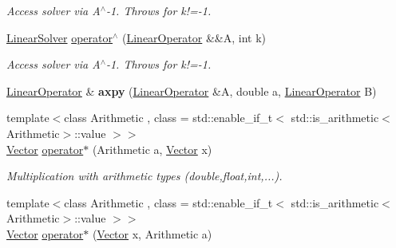 \begin{DoxyCompactItemize}
\begin{DoxyCompactList}\small\item\em Access solver via A$^\wedge$-\/1. Throws for k!=-\/1. \end{DoxyCompactList}\item 
\hyperlink{namespaceSpacy_adcd0d78166a9c972b8a2e5a689fc2d03}{Linear\+Solver} \hyperlink{namespaceSpacy_a6defec6ee302bf4c1054afc65c9fcb95}{operator$^\wedge$} (\hyperlink{classSpacy_1_1LinearOperator}{Linear\+Operator} \&\&A, int k)\hypertarget{namespaceSpacy_a6defec6ee302bf4c1054afc65c9fcb95}{}\label{namespaceSpacy_a6defec6ee302bf4c1054afc65c9fcb95}

\begin{DoxyCompactList}\small\item\em Access solver via A$^\wedge$-\/1. Throws for k!=-\/1. \end{DoxyCompactList}\item 
\hyperlink{classSpacy_1_1LinearOperator}{Linear\+Operator} \& {\bfseries axpy} (\hyperlink{classSpacy_1_1LinearOperator}{Linear\+Operator} \&A, double a, \hyperlink{classSpacy_1_1LinearOperator}{Linear\+Operator} B)\hypertarget{namespaceSpacy_ad08055ec05275c6042d516d4726b5e8f}{}\label{namespaceSpacy_ad08055ec05275c6042d516d4726b5e8f}

\item 
{\footnotesize template$<$class Arithmetic , class  = std\+::enable\+\_\+if\+\_\+t$<$ std\+::is\+\_\+arithmetic$<$\+Arithmetic$>$\+::value $>$$>$ }\\\hyperlink{classSpacy_1_1Vector}{Vector} \hyperlink{namespaceSpacy_ae0a1cbb3d98d6ac0a82727959038f4b4}{operator$\ast$} (Arithmetic a, \hyperlink{classSpacy_1_1Vector}{Vector} x)\hypertarget{namespaceSpacy_ae0a1cbb3d98d6ac0a82727959038f4b4}{}\label{namespaceSpacy_ae0a1cbb3d98d6ac0a82727959038f4b4}

\begin{DoxyCompactList}\small\item\em Multiplication with arithmetic types (double,float,int,...). \end{DoxyCompactList}\item 
{\footnotesize template$<$class Arithmetic , class  = std\+::enable\+\_\+if\+\_\+t$<$ std\+::is\+\_\+arithmetic$<$\+Arithmetic$>$\+::value $>$$>$ }\\\hyperlink{classSpacy_1_1Vector}{Vector} \hyperlink{namespaceSpacy_a0120fd6b1d7580a9f7b8f24e646cbc6c}{operator$\ast$} (\hyperlink{classSpacy_1_1Vector}{Vector} x, Arithmetic a)\hypertarget{namespaceSpacy_a0120fd6b1d7580a9f7b8f24e646cbc6c}{}\label{namespaceSpacy_a0120fd6b1d7580a9f7b8f24e646cbc6c}


\end{DoxyCompactItemize}
